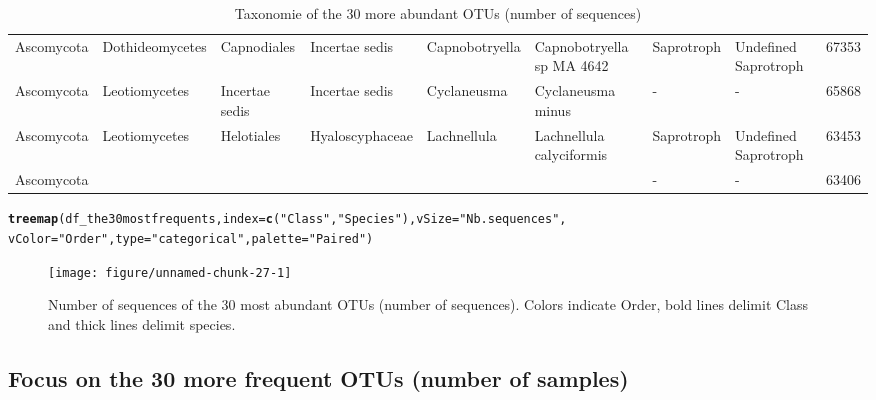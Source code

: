 \documentclass[12pt]{article}\usepackage[]{graphicx}\usepackage[]{color}
\makeatletter
\newcommand{\hlstr}[1]{\textcolor[rgb]{0.192,0.494,0.8}{#1}}%
\newcommand{\hlstd}[1]{\textcolor[rgb]{0.345,0.345,0.345}{#1}}%
\newcommand{\hlkwc}[1]{\textcolor[rgb]{0.333,0.667,0.333}{#1}}%
\newcommand{\hlkwd}[1]{\textcolor[rgb]{0.737,0.353,0.396}{\textbf{#1}}}%
\newenvironment{kframe}{%
 \def\at@end@of@kframe{}%
 \ifinner\ifhmode%
  \def\at@end@of@kframe{\end{minipage}}%
  \begin{minipage}{\columnwidth}%
 \fi\fi%
 \def\FrameCommand##1{\hskip\@totalleftmargin \hskip-\fboxsep
 \colorbox{shadecolor}{##1}\hskip-\fboxsep
     \hskip-\linewidth \hskip-\@totalleftmargin \hskip\columnwidth}%
 \MakeFramed {\advance\hsize-\width
   \@totalleftmargin\z@ \linewidth\hsize
   \@setminipage}}%
 {\par\unskip\endMakeFramed%
 \at@end@of@kframe}
\newenvironment{knitrout}{}{} %
\numberwithin{figure}{section}
\makeatother
\begin{document}
\begin{landscape}
\begin{table}[ht]
\begin{tabular}{llllllllr}
  Ascomycota & Dothideomycetes & Capnodiales & Incertae sedis & Capnobotryella & Capnobotryella sp MA 4642 & Saprotroph & Undefined Saprotroph & 67353 \\ 
  Ascomycota & Leotiomycetes & Incertae sedis & Incertae sedis & Cyclaneusma & Cyclaneusma minus & - & - & 65868 \\ 
  Ascomycota & Leotiomycetes & Helotiales & Hyaloscyphaceae & Lachnellula & Lachnellula calyciformis & Saprotroph & Undefined Saprotroph & 63453 \\ 
  Ascomycota &  &  &  &  &  & - & - & 63406 \\ 
   \hline
\end{tabular}
\endgroup
\caption{Taxonomie of the 30 more
             abundant OTUs (number of sequences)} 
\end{table}

\end{landscape}

\begin{knitrout}\small
{}\color{fgcolor}\begin{kframe}
\begin{alltt}
\hlkwd{treemap}\hlstd{(df_the30mostfrequents,} \hlkwc{index} \hlstd{=} \hlkwd{c}\hlstd{(}\hlstr{"Class"}\hlstd{,} \hlstr{"Species"}\hlstd{),} \hlkwc{vSize} \hlstd{=} \hlstr{"Nb.sequences"}\hlstd{,}
        \hlkwc{vColor} \hlstd{=} \hlstr{"Order"}\hlstd{,} \hlkwc{type} \hlstd{=} \hlstr{"categorical"}\hlstd{,} \hlkwc{palette} \hlstd{=} \hlstr{"Paired"}\hlstd{)}
\end{alltt}
\end{kframe}\begin{figure}

{\centering \texttt{[image: figure/unnamed-chunk-27-1]} 

}

\caption[Number of sequences of the 30 most abundant OTUs (number of sequences)]{Number of sequences of the 30 most abundant OTUs (number of sequences). Colors indicate Order, bold lines delimit Class and thick lines delimit species.}\label{fig:unnamed-chunk-27}
\end{figure}


\end{knitrout}

  \subsection{Focus on the 30 more frequent OTUs (number of samples)}
\end{document}
